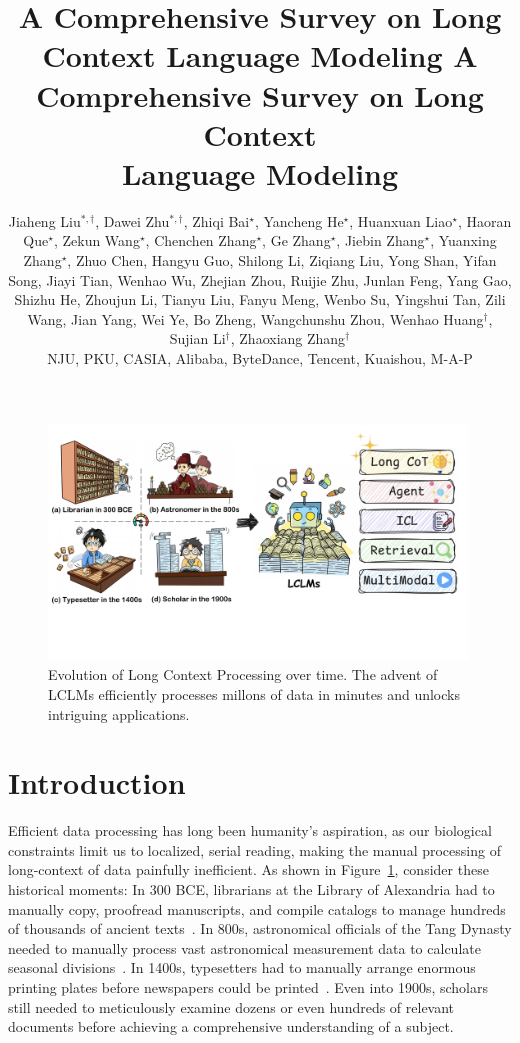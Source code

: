 \documentclass[11pt, a4paper, logo, copyright, nonumbering]{map}
\title{A Comprehensive Survey on Long Context Language Modeling}
\title{\vspace{-0.2in}
\centering A Comprehensive Survey on Long Context \\ Language Modeling
    \vspace{-0.2in}
}
\author{
\small
Jiaheng Liu$^{\ast,\dagger}$, 
Dawei Zhu$^{\ast, \dagger}$, 
Zhiqi Bai$^{\star}$,
Yancheng He$^{\star}$, 
Huanxuan Liao$^{\star}$,
Haoran Que$^{\star}$, 
Zekun Wang$^{\star}$,
Chenchen Zhang$^{\star}$,
Ge Zhang$^{\star}$,
Jiebin Zhang$^{\star}$,
Yuanxing Zhang$^{\star}$,
Zhuo Chen,
Hangyu Guo,
Shilong Li,
Ziqiang Liu,
Yong Shan,
Yifan Song,
Jiayi Tian,
Wenhao Wu,
Zhejian Zhou,
Ruijie Zhu,
Junlan Feng,
Yang Gao,
Shizhu He,
Zhoujun Li,
Tianyu Liu,
Fanyu Meng,
Wenbo Su,
Yingshui Tan,
Zili Wang,
Jian Yang,
Wei Ye,
Bo Zheng,
Wangchunshu Zhou,
Wenhao Huang$^\dagger$,
Sujian Li$^\dagger$,
Zhaoxiang Zhang$^\dagger$
\\
        \vspace{0.1in}
NJU, PKU, CASIA, Alibaba, ByteDance, Tencent, Kuaishou, M-A-P
    \vspace{-0.35in}

}
\begin{document}
\maketitle


\let\oldthefootnote\thefootnote

\let\thefootnote\relax{}
\let\thefootnote\oldthefootnote



\begin{figure}[H]
    \vspace{-5mm}
    \centering
    \includegraphics[width=0.99\textwidth]{graphs/intro.pdf}
    \vspace{-2mm}
    \caption{Evolution of Long Context Processing over time. The advent of LCLMs efficiently processes millons of data in minutes and unlocks intriguing applications.}
    \label{fig:intro}
\end{figure}

\newpage

\tableofcontents

\newpage

\section{Introduction} 




Efficient data processing has long been humanity's aspiration, as our biological constraints limit us to localized, serial reading, making the manual processing of long-context of data painfully inefficient.
As shown in Figure~\ref{fig:intro},
consider these historical moments: In 300 BCE, librarians at the Library of Alexandria had to manually copy, proofread manuscripts, and compile catalogs to manage hundreds of thousands of ancient texts~\citep{alex_library}. In 800s, astronomical officials of the Tang Dynasty needed to manually process vast astronomical measurement data to calculate seasonal divisions~\citep{tang_astronomer}. In 1400s, typesetters had to manually arrange enormous printing plates before newspapers could be printed~\citep{print_press}. Even into 1900s, scholars still needed to meticulously examine dozens or even hundreds of relevant documents before achieving a comprehensive understanding of a subject. 
\end{document}
